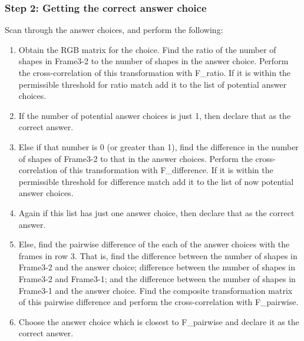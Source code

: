 \documentclass[10pt, letter]{article}
\begin{document}
\subsubsection*{Step 2: Getting the correct answer choice}
Scan through the answer choices, and perform the following:
\begin{enumerate}
	\item Obtain the RGB matrix for the choice. Find the ratio of the number of shapes in Frame3-2 to the number of shapes in the answer choice. Perform the cross-correlation of this transformation with F\_ratio. If it is within the permissible threshold for ratio match add it to the list of potential answer choices.
	\item If the number of potential answer choices is just 1, then declare that as the correct answer.
	\item Else if that number is 0 (or greater than 1), find the difference in the number of shapes of Frame3-2 to that in the answer choices. Perform the cross-correlation of this transformation with F\_difference. If it is within the permissible threshold for difference match add it to the list of now potential answer choices.
	\item Again if this list has just one answer choice, then declare that as the correct answer.
	\item Else, find the pairwise difference of the each of the answer choices with the frames in row 3. That is, find the difference between the number of shapes in Frame3-2 and the answer choice; difference between the number of shapes in Frame3-2 and Frame3-1; and the difference between the number of shapes in Frame3-1 and the answer choice. Find the composite transformation matrix of this pairwise difference and perform the cross-correlation with F\_pairwise.
	\item Choose the answer choice which is closest to F\_pairwise and declare it as the correct answer.
\end{enumerate}
\end{document}
